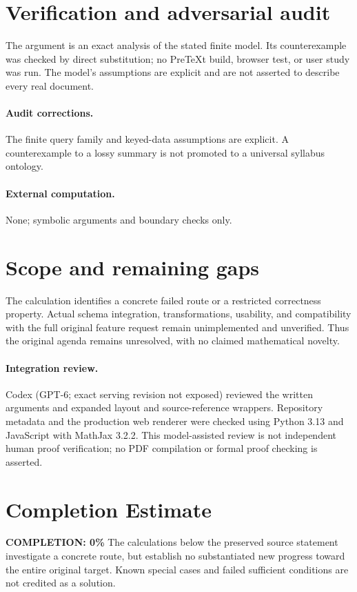 \documentclass[11pt]{article}
\begin{document}
\section{Verification and adversarial audit}
The argument is an exact analysis of the stated finite model. Its counterexample was checked by direct substitution; no PreTeXt build, browser test, or user study was run. The model's assumptions are explicit and are not asserted to describe every real document.
\paragraph{Audit corrections.} The finite query family and keyed-data assumptions are explicit. A counterexample to a lossy summary is not promoted to a universal syllabus ontology.
\paragraph{External computation.} None; symbolic arguments and boundary checks only.
\section{Scope and remaining gaps}
The calculation identifies a concrete failed route or a restricted correctness property. Actual schema integration, transformations, usability, and compatibility with the full original feature request remain unimplemented and unverified. Thus the original agenda remains unresolved, with no claimed mathematical novelty.
\paragraph{Integration review.} Codex (GPT-6; exact serving revision not exposed) reviewed the written arguments and expanded layout and source-reference wrappers. Repository metadata and the production web renderer were checked using Python 3.13 and JavaScript with MathJax 3.2.2. This model-assisted review is not independent human proof verification; no PDF compilation or formal proof checking is asserted.

\section{Completion Estimate}
\noindent\textbf{COMPLETION: 0\%}
The calculations below the preserved source statement investigate a concrete route,
but establish no substantiated new progress toward the entire original target.
Known special cases and failed sufficient conditions are not credited as a solution.
\end{document}
